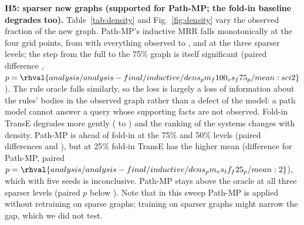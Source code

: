 \vspace{4pt}\noindent\textbf{H5: sparser new graphs (supported for Path-MP; the fold-in baseline degrades too).} Table~\ref{tab:density} and Fig.~\ref{fig:density} vary the observed fraction of the new graph. Path-MP's inductive MRR falls monotonically at the four grid points, from  with everything observed to ,  and  at the three sparser levels; the step from the full to the 75\% graph is itself significant (paired difference , $p=\rhval{analysis/analysis-final/inductive/dens_pm_f100_vs_f75_p/mean:sci2}$). The rule oracle falls similarly, so the loss is largely a loss of information about the rules' bodies in the observed graph rather than a defect of the model: a path model cannot answer a query whose supporting facts are not observed. Fold-in TransE degrades more gently ( to ) and the ranking of the systems changes with density. Path-MP is ahead of fold-in at the 75\% and 50\% levels (paired differences  and ), but at 25\% fold-in TransE has the higher mean (difference  for Path-MP, paired $p=\rhval{analysis/analysis-final/inductive/dens_pm_vs_tf_f25_p/mean:2}$), which with five seeds is inconclusive. Path-MP stays above the oracle at all three sparser levels (paired $p$ below ). Note that in this sweep Path-MP is applied without retraining on sparse graphs; training on sparser graphs might narrow the gap, which we did not test.
